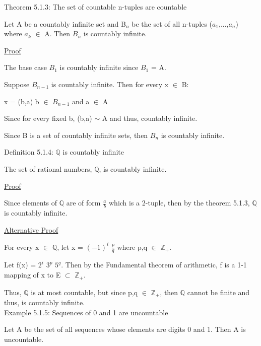 { \color{red} Theorem 5.1.3: The set of countable n-tuples are countable } 

	\begin{adjustbox}{minipage=14cm, right}
		Let A be a countably infinite set and B$_n$ be the set of all
		n-tuples ($a_1$,...,$a_n$) where $a_k$ $\in$ A.
		Then $B_n$ is countably infinite.
	\end{adjustbox}

{ \color{magenta} \underline{Proof} } 
	
	The base case $B_1$ is countably infinite since $B_1$ = A.

	Suppose $B_{n-1}$ is countably infinite. Then for every x $\in$ B:

	\qquad x = (b,a) \qquad \qquad b $\in$ $B_{n-1}$ and a $\in$ A

	Since for every fixed b, (b,a) $\sim$ A and thus, countably infinite.

	Since B is a set of countably infinite sets, then $B_{n}$
	is countably infinite. \\

\newpage

{ \color{blue} Definition 5.1.4: $\mathbb{Q}$ is countably infinite } 

	\begin{adjustbox}{minipage=14cm, right}
		The set of rational numbers, $\mathbb{Q}$, is countably infinite.
	\end{adjustbox}

{ \color{magenta} \underline{Proof} } 
	
	Since elements of $\mathbb{Q}$ are of form $\frac{a}{b}$ which is a
	2-tuple, then by the {\color{red} theorem 5.1.3}, $\mathbb{Q}$ is countably infinite.

{ \color{magenta} \underline{Alternative Proof} } 
	
	For every x $\in$ $\mathbb{Q}$, let x = $(-1)^i$ $\frac{p}{q}$ where p,q $\in$ $\mathbb{Z}_+$.

	Let f(x) = $2^i$ $3^p$ $5^q$. Then by the Fundamental theorem of arithmetic,
	f is a 1-1 mapping of x to E $\subset$ $\mathbb{Z}_+$.

	Thus, $\mathbb{Q}$ is at most countable, but since p,q $\in$ $\mathbb{Z}_+$,
	then $\mathbb{Q}$ cannot be finite and thus, is countably infinite. \\

{ \color{purple} Example 5.1.5: Sequences of 0 and 1 are uncountable } 

	\begin{adjustbox}{minipage=14cm, right}
		Let A be the set of all sequences whose elements are digits 0 and 1.
		Then A is uncountable.
	\end{adjustbox}

